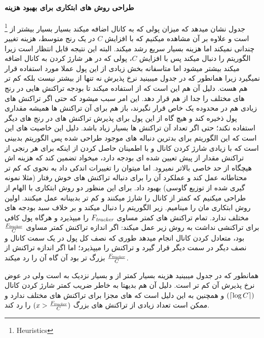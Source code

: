 \paragraph{ طراحی روش های ابتکاری برای بهبود هزینه \on}\footnote{Heuristics}
جدول  نشان میدهد که میزان پولی که \on به کانال اضافه میکند بسیار بسیار بیشتر از \off است و علاوه بر آن مشاهده میکنیم که با افزایش $C$  در یک رنج متوسط، هزینه \off تغییر چندانی نمیکند اما هزینه \on بسیار سریع رشد میکند. البته این نتیجه قابل انتظار است زیرا \on الگوریتم 
را دنبال میکند پس با افزایش $C$، پولی که در هر شارژ کردن به کانال اضافه میکند بیشتر میشود اما متاسفانه بخش زیادی از این پول عملا مورد استفاده قرار نمیگیرد زیرا همانطور که در جدول میبینید نرخ پذیرش \on نه تنها از \off بیشتر نیست بلکه کم تر هم هست.
 دلیل آن هم این است که \on از \bucket استفاده میکند تا بودجه تراکنش هایی در رنج های مختلف را جدا از هم قرار دهد. این امر سبب میشود که حتی اگر تراکنش های زیادی هم در محدوده یک \bucket خاص قرار نگیرند، باز هم \on برای آن تراکنش ها همیشه مقداری پول ذخیره کند و هیچ گاه از این پول برای پذیرش تراکنش های در رنج های دیگر استفاده نکند؛ حتی اگر تعداد آن تراکنش ها بسیار زیاد باشد.
دلیل این خاصیت های \on این است که این الگوریتم برای بدترین دنباله های موجود طراحی شده پس الگوریتم بدبینی است که با زیادی شارژ کردن کانال و با اطمینان حاصل کردن از اینکه برای هر رنجی از تراکنش مقدار از پیش تعیین شده ای بودجه دارد، میخواد تضمین کند که هزینه اش هیچگاه از حد خاصی بالاتر نمیرود. اما میتوان \on را تغییرات اندکی داد به نحوی که کم تر محتاطانه عمل کند و عملکرد آن را برای دنباله تراکنش های خوش رفتار (مثلا نمونه گیری شده از توزیع گاوسی) بهبود داد.
برای این منظور دو روش ابتکاری با الهام از \on طراحی میکنیم که کمتر از \on کانال را شارژ میکنند و کم تر بدبینانه عمل میکنند.
اولین روش ابتکاری مان را \oni مینامیم. \oni
زیر الگوریتم
را دنبال میکند و بر خلاف \on سبد بودجه های مختلف ندارد.
\oni تمام تراکنش های کمتر مساوی
$F_{\textit{tracker}}$
را میپذیرد و هرگاه پول کافی برای تراکنشی نداشت به روش زیر عمل میکند: اگر اندازه تراکنش کمتر مساوی
$\frac{F_{\textit{tracker}}}{C}$
بود، متعادل کردن کانال انجام میدهد طوری که نصف کل پول در یک سمت کانال و نصف دیگر در سمت دیگر قرار گیرد و تراکنش را میپذیرد؛ اما اگر اندازه تراکنش از 
$\frac{F_{\textit{tracker}}}{C}$
بزرگ تر بود آن گاه \oni آن را رد میکند.

همانطور که در جدول    میبینید هزینه \oni بسیار کمتر از \on و بسیار نزدیک به \off  است ولی در عوض نرخ پذیرش آن کم تر است. دلیل آن هم بدیهتا به خاطر ضریب کمتر شارژ کردن کانال
$(\lceil \log C \rceil)$
و همچنین به این دلیل است که \oni   
\bucket های مجزا برای تراکنش های مختلف ندارد و ممکن است تعداد زیادی از تراکنش های بزرگ 
$(x > \frac{F_{\textit{tracker}}}{C})$
را رد کند.

